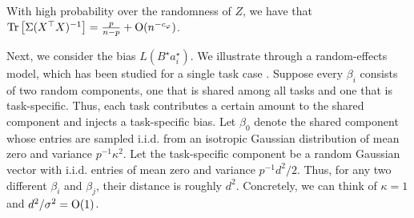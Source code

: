 \begin{fact}\label{fact_tr}
	With high probability over the randomness of $Z$, we have that $\operatorname{Tr}\left[\Sigma (X^{\top} X)^{-1}\right] = \frac{p}{n - p} + \operatorname{O}(n^{-c_{\varphi}})$.
\end{fact}


Next, we consider the bias $L(B^{\star} a^{\star}_i)$.
We illustrate through a random-effects model, which has been studied for a single task case \cite{dobriban2020wonder}.
Suppose every $\beta_i$ consists of two random components, one that is shared among all tasks and one that is task-specific.
Thus, each task contributes a certain amount to the shared component and injects a task-specific bias.
Let $\beta_0$ denote the shared component whose entries are sampled i.i.d. from an isotropic Gaussian distribution of mean zero and variance $p^{-1}\kappa^2$.
Let the task-specific component be a random Gaussian vector with i.i.d. entries of mean zero and variance $p^{-1} d^2 / 2$.
Thus, for any two different $\beta_i$ and $\beta_j$, their distance is roughly $d^2$.
Concretely, we can think of $\kappa = 1$ and $d^2/\sigma^2 = \operatorname{O}(1)$.

